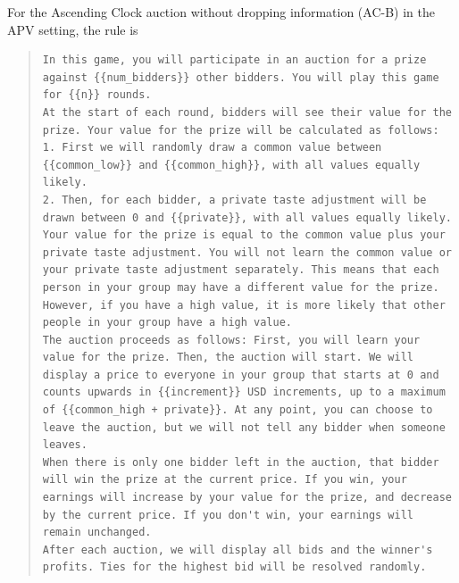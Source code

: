 \documentclass{article} %
\begin{document}
For the Ascending Clock auction without dropping information (AC-B) in the APV setting, the rule is
\begin{quote}
\begin{lstlisting}[basicstyle=\ttfamily, breaklines=true]
In this game, you will participate in an auction for a prize against {{num_bidders}} other bidders. You will play this game for {{n}} rounds. 
At the start of each round, bidders will see their value for the prize. Your value for the prize will be calculated as follows:
1. First we will randomly draw a common value between {{common_low}} and {{common_high}}, with all values equally likely.
2. Then, for each bidder, a private taste adjustment will be drawn between 0 and {{private}}, with all values equally likely.
Your value for the prize is equal to the common value plus your private taste adjustment. You will not learn the common value or your private taste adjustment separately. This means that each person in your group may have a different value for the prize. However, if you have a high value, it is more likely that other people in your group have a high value.
The auction proceeds as follows: First, you will learn your value for the prize. Then, the auction will start. We will display a price to everyone in your group that starts at 0 and counts upwards in {{increment}} USD increments, up to a maximum of {{common_high + private}}. At any point, you can choose to leave the auction, but we will not tell any bidder when someone leaves. 
When there is only one bidder left in the auction, that bidder will win the prize at the current price. If you win, your earnings will increase by your value for the prize, and decrease by the current price. If you don't win, your earnings will remain unchanged.
After each auction, we will display all bids and the winner's profits. Ties for the highest bid will be resolved randomly.\end{lstlisting}
\end{quote}
\end{document}
